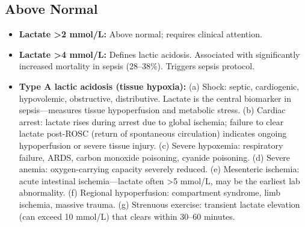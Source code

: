 \subsection*{Above Normal}
\begin{itemize}
  \item \textbf{Lactate >2 mmol/L:} Above normal; requires clinical attention.
  \item \textbf{Lactate >4 mmol/L:} Defines lactic acidosis. Associated with significantly increased mortality in sepsis (28--38\%). Triggers sepsis protocol.
  \item \textbf{Type A lactic acidosis (tissue hypoxia):} (a) Shock: septic, cardiogenic, hypovolemic, obstructive, distributive. Lactate is the central biomarker in sepsis---measures tissue hypoperfusion and metabolic stress. (b) Cardiac arrest: lactate rises during arrest due to global ischemia; failure to clear lactate post-ROSC (return of spontaneous circulation) indicates ongoing hypoperfusion or severe tissue injury. (c) Severe hypoxemia: respiratory failure, ARDS, carbon monoxide poisoning, cyanide poisoning. (d) Severe anemia: oxygen-carrying capacity severely reduced. (e) Mesenteric ischemia: acute intestinal ischemia---lactate often >5 mmol/L, may be the earliest lab abnormality. (f) Regional hypoperfusion: compartment syndrome, limb ischemia, massive trauma. (g) Strenuous exercise: transient lactate elevation (can exceed 10 mmol/L) that clears within 30--60 minutes.

\end{itemize}
